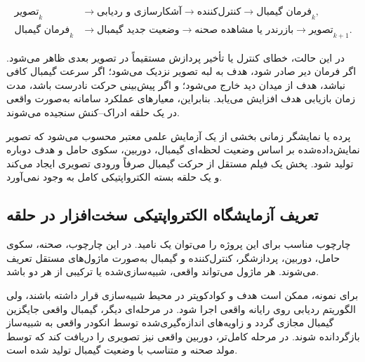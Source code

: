 \documentclass[12pt,a4paper]{article}
\begin{document}
\begin{equation}
	\begin{aligned}
		\text{تصویر}_{k}
		&\longrightarrow
		\text{آشکارسازی و ردیابی}
		\longrightarrow
		\text{کنترل‌کننده}
		\longrightarrow
		\text{فرمان گیمبال}_{k},
		\\
		\text{فرمان گیمبال}_{k}
		&\longrightarrow
		\text{وضعیت جدید گیمبال}
		\longrightarrow
		\text{بازرندر یا مشاهده صحنه}
		\longrightarrow
		\text{تصویر}_{k+1}.
	\end{aligned}
	\label{eq:closed_loop_hil}
\end{equation}

در این حالت، خطای کنترل یا تأخیر پردازش مستقیماً در تصویر بعدی
ظاهر می‌شود. اگر فرمان دیر صادر شود، هدف به لبه تصویر نزدیک
می‌شود؛ اگر سرعت گیمبال کافی نباشد، هدف از میدان دید خارج می‌شود؛
و اگر پیش‌بینی حرکت نادرست باشد، مدت زمان بازیابی هدف افزایش
می‌یابد. بنابراین، معیارهای عملکرد سامانه به‌صورت واقعی در یک
حلقه ادراک--کنش سنجیده می‌شوند.

\begin{warningbox}
	پرده یا نمایشگر زمانی بخشی از یک آزمایش علمی معتبر محسوب می‌شود
	که تصویر نمایش‌داده‌شده بر اساس وضعیت لحظه‌ای گیمبال، دوربین،
	سکوی حامل و هدف دوباره تولید شود. پخش یک فیلم مستقل از حرکت
	گیمبال صرفاً ورودی تصویری ایجاد می‌کند و یک حلقه بسته
	الکترواپتیکی کامل به وجود نمی‌آورد.
\end{warningbox}

\subsection{تعریف آزمایشگاه الکترواپتیکی سخت‌افزار در حلقه}
\label{subsec:eo_hil_definition}

چارچوب مناسب برای این پروژه را می‌توان یک
نامید. در این چارچوب، صحنه، سکوی حامل، دوربین، پردازشگر،
کنترل‌کننده و گیمبال به‌صورت ماژول‌های مستقل تعریف می‌شوند.
هر ماژول می‌تواند واقعی، شبیه‌سازی‌شده یا ترکیبی از هر دو باشد.

برای نمونه، ممکن است هدف و کوادکوپتر در محیط شبیه‌سازی قرار
داشته باشند، ولی الگوریتم ردیابی روی رایانه واقعی اجرا شود.
در مرحله‌ای دیگر، گیمبال واقعی جایگزین گیمبال مجازی گردد و
زاویه‌های اندازه‌گیری‌شده توسط انکودر واقعی به شبیه‌ساز بازگردانده
شوند. در مرحله کامل‌تر، دوربین واقعی نیز تصویری را دریافت کند که
توسط مولد صحنه و متناسب با وضعیت گیمبال تولید شده است.
\end{document}
